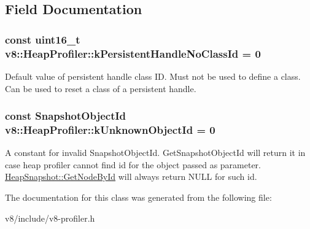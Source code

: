 \subsection{Field Documentation}
\subsubsection[{\texorpdfstring{k\+Persistent\+Handle\+No\+Class\+Id}{kPersistentHandleNoClassId}}]{\setlength{\rightskip}{0pt plus 5cm}const uint16\+\_\+t v8\+::\+Heap\+Profiler\+::k\+Persistent\+Handle\+No\+Class\+Id = 0\hspace{0.3cm}{\ttfamily [static]}}\hypertarget{classv8_1_1HeapProfiler_a272c9af3ea5cd90a2737af3d22a7eb78}{}\label{classv8_1_1HeapProfiler_a272c9af3ea5cd90a2737af3d22a7eb78}
Default value of persistent handle class ID. Must not be used to define a class. Can be used to reset a class of a persistent handle. 
\subsubsection[{\texorpdfstring{k\+Unknown\+Object\+Id}{kUnknownObjectId}}]{\setlength{\rightskip}{0pt plus 5cm}const Snapshot\+Object\+Id v8\+::\+Heap\+Profiler\+::k\+Unknown\+Object\+Id = 0\hspace{0.3cm}{\ttfamily [static]}}\hypertarget{classv8_1_1HeapProfiler_abf2b9d8facb18473f9b124ab8baf5786}{}\label{classv8_1_1HeapProfiler_abf2b9d8facb18473f9b124ab8baf5786}
A constant for invalid Snapshot\+Object\+Id. Get\+Snapshot\+Object\+Id will return it in case heap profiler cannot find id for the object passed as parameter. \hyperlink{classv8_1_1HeapSnapshot_a023696f94fe538380922bf2c40c97b7b}{Heap\+Snapshot\+::\+Get\+Node\+By\+Id} will always return N\+U\+LL for such id. 

The documentation for this class was generated from the following file\+:\begin{DoxyCompactItemize}
\item 
v8/include/v8-\/profiler.\+h\end{DoxyCompactItemize}
